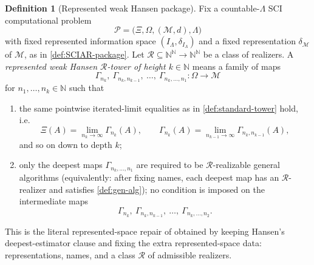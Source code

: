 \documentclass{lmcs} %
\theoremstyle{plain}
\theoremstyle{plain}
\theoremstyle{definition}
\newtheorem{definition}[theorem]{Definition}
\theoremstyle{remark}
\theoremstyle{definition}
\theoremstyle{remark}
\numberwithin{equation}{section}
\begin{document}
\begin{definition}[Represented weak Hansen package]\label{def:weak-Hansen-represented}
	Fix a countable-$\Lambda$ SCI computational problem
	\[
	\mathcal P= \bigl( \Xi,\Omega,(\mathcal M,d),\Lambda \bigr)
	\]
	with fixed represented information space $(I_\Lambda,\delta_{I_\Lambda})$ and a fixed
	representation $\delta_{\mathcal M}$ of $\mathcal M$, as in \cref{def:SCIAR-package}.
	Let $\mathcal R\subseteq \mathbb N^{\mathbb N}\to\mathbb N^{\mathbb N}$ be a class of realizers.
	A \textit{represented weak Hansen $\mathcal R$-tower of height $k\in\mathbb N$} means a family of
	maps
	\[
	\Gamma_{n_k},\ \Gamma_{n_k,n_{k-1}},\ \dots,\ \Gamma_{n_k,\dots,n_1}\colon \Omega\to \mathcal M
    \]
    for $n_1,\dots,n_k\in\mathbb N$	such that
	\begin{enumerate}
		\item the same pointwise iterated-limit equalities as in \cref{def:standard-tower} hold, i.e.
		\[
		\Xi(A)=\lim_{n_k\to\infty}\Gamma_{n_k}(A),\qquad
		\Gamma_{n_k}(A)=\lim_{n_{k-1}\to\infty}\Gamma_{n_k,n_{k-1}}(A),
		\]
		and so on down to depth $k$;
		\item only the deepest maps $\Gamma_{n_k,\dots,n_1}$ are required to be
		$\mathcal R$-realizable general algorithms (equivalently: after fixing names, each deepest map has an $\mathcal R$-realizer and satisfies \cref{def:gen-alg}); no condition is imposed on the intermediate maps
		\[
		\Gamma_{n_k},\ \Gamma_{n_k,n_{k-1}},\ \dots,\ \Gamma_{n_k,\dots,n_2}.
		\]
	\end{enumerate}
	This is the literal represented-space repair of \cite[Definition~3.1]{hansen2011solvability} obtained by keeping Hansen's deepest-estimator clause and fixing the extra represented-space data: representations, names, and a class \(\mathcal R\) of admissible realizers.
\end{definition}
\end{document}
